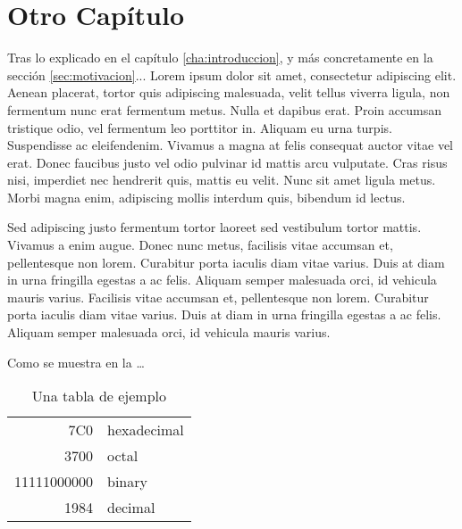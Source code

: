 



\chapter{Otro Capítulo}
\label{cha:otro_capitulo}

\ifpdf
    \graphicspath{{2_another_chapter/figures/PNG/}{2_another_chapter/figures/PDF/}{2_another_chapter/figures/}}
\else
    \graphicspath{{2_another_chapter/figures/EPS/}{2_another_chapter/figures/}}
\fi



Tras lo explicado en el capítulo \ref{cha:introduccion}, y más concretamente en
la sección \ref{sec:motivacion}... Lorem ipsum dolor sit amet, consectetur 
adipiscing elit. Aenean placerat, tortor quis adipiscing malesuada, velit 
tellus viverra ligula, non fermentum nunc erat fermentum metus. Nulla et dapibus
erat. Proin accumsan tristique odio, vel fermentum leo porttitor in. Aliquam 
eu urna turpis. Suspendisse ac eleifendenim. Vivamus a magna at felis consequat
auctor vitae vel erat. Donec faucibus justo vel odio pulvinar id mattis arcu 
vulputate. Cras risus nisi, imperdiet nec hendrerit quis, mattis eu velit. 
Nunc sit amet ligula metus. Morbi magna enim, adipiscing mollis interdum 
quis, bibendum id lectus. 

Sed adipiscing justo fermentum tortor laoreet sed vestibulum tortor mattis.
Vivamus a enim augue. Donec nunc metus, facilisis vitae accumsan et,
pellentesque non lorem. Curabitur porta iaculis diam vitae varius. Duis at diam
in urna fringilla egestas a ac felis. Aliquam semper malesuada orci, id vehicula
mauris varius. Facilisis vitae accumsan et, pellentesque non lorem. Curabitur 
porta iaculis diam vitae varius. Duis at diam in urna fringilla egestas a ac 
felis. Aliquam semper malesuada orci, id vehicula mauris varius.

Como se muestra en la  \ldots

\begin{table}
\center
\caption{Una tabla de ejemplo}
\begin{tabular}{|r|l|}
  \hline
  7C0 & hexadecimal \\
  3700 & octal \\ \cline{2-2}
  11111000000 & binary \\
  \hline \hline
  1984 & decimal \\
  \hline
\end{tabular}
\label{tab:example}
\end{table}


